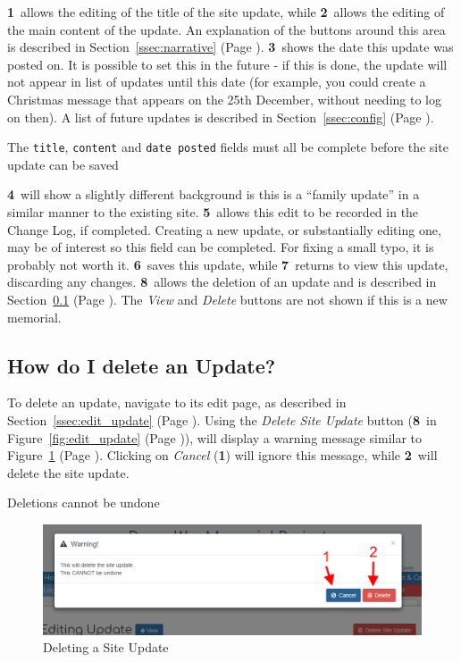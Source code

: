 \documentclass[12pt]{article}
\newcommand{\marker}[1]{\color{red}\textbf{#1}\color{black}}
\newcommand{\myref}[1]{\ref{#1} {\scriptsize(Page \pageref{#1})}}
\begin{document}
\marker{1}\ allows the editing of the title of the site update, while \marker{2}\ allows the editing of the main content of the update. An explanation of the buttons around this area is described in Section~\myref{ssec:narrative}. \marker{3}\ shows the date this update was posted on. It is possible to set this in the future - if this is done, the update will not appear in list of updates until this date (for example, you could create a Christmas message that appears on the 25th December, without needing to log on then). A list of future updates is described in Section~\myref{ssec:config}.

\begin{infoBox}
The \texttt{title}, \texttt{content} and \texttt{date posted} fields must all be complete before the site update can be saved
\end{infoBox}

\marker{4}\ will show a slightly different background is this is a ``family update'' in a similar manner to the existing site. \marker{5}\ allows this edit to be recorded in the Change Log, if completed. Creating a new update, or substantially editing one, may be of interest so this field can be completed. For fixing a small typo, it is probably not worth it. \marker{6}\ saves this update, while \marker{7}\ returns to view this update, discarding any changes. \marker{8}\ allows the deletion of an update and is described in Section~\myref{ssec:delete_update}. The \textit{View} and \textit{Delete} buttons are not shown if this is a new memorial.

\FloatBarrier
\subsection{How do I delete an Update?}\label{ssec:delete_update}
To delete an update, navigate to its edit page, as described in Section~\myref{ssec:edit_update}. Using the \textit{Delete Site Update} button (\marker{8}\ in Figure~\myref{fig:edit_update}), will display a warning message similar to Figure~\myref{fig:delete_update}. Clicking on \textit{Cancel} (\marker{1}) will ignore this message, while \marker{2}\ will delete the site update.

\begin{warningBox}
Deletions cannot be undone
\end{warningBox}

\begin{figure}[h]
  \centering
 \includegraphics[width=.9\textwidth]{pics/delete_update.png}
	\caption{Deleting a Site Update}\label{fig:delete_update}
\end{figure}
\end{document}
